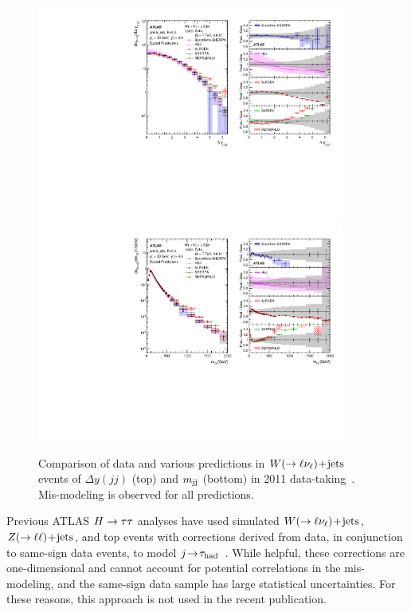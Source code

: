 \clearpage
\begin{figure}[tp]
  \centering
  \includegraphics[width=0.90\textwidth]{figures/STDM-2012-24/fig_26a}
  \includegraphics[width=0.90\textwidth]{figures/STDM-2012-24/fig_28a}
  \caption{Comparison of data and various predictions in $W (\rightarrow \ell\nu_\ell)\!+\!\text{jets}$ events of $\Delta y(jj)$ (top) and $m_{\text{jj}}$ (bottom) in 2011 data-taking~\cite{STDM-2012-24}. Mis-modeling is observed for all predictions.}
  \label{fig:backgrounds-wjets}
\end{figure}
\clearpage

Previous ATLAS $H\rightarrow\tau\tau$ analyses have used simulated $W (\rightarrow \ell\nu_\ell)\!+\!\text{jets}$, $Z (\rightarrow \ell\ell)\!+\!\text{jets}$, and top events with corrections derived from data, in conjunction to same-sign data events, to model $j\!\rightarrow\!\tau_\text{had}$~\cite{HIGG-2012-07,ATLAS-CONF-2012-160}. While helpful, these corrections are one-dimensional and cannot account for potential correlations in the mis-modeling, and the same-sign data sample has large statistical uncertainties. For these reasons, this approach is not used in the recent publication.

